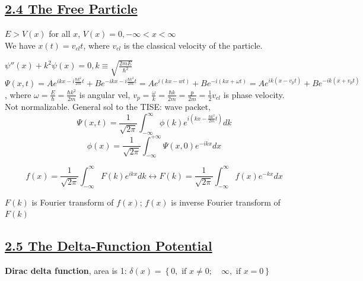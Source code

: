 
\subsection{\underline{2.4 The Free Particle}}
$E > V(x)$ for all $x$, $V(x) = 0, -\infty < x < \infty$ \\

We have $x(t) = v_{cl} t$, where $v_{cl}$ is the classical velocity of the particle.

$\psi''(x) + k^2 \psi(x) = 0, k \equiv \sqrt{\frac{2mE}{\hbar^2}}$ \\
$\Psi(x, t) = Ae^{ikx - i \frac{\hbar k^2}{2m} t} + Be^{-ikx - i \frac{\hbar k^2}{2m} t} = A e^{i(kx - wt)} + Be^{-i(kx + \omega t)} = A e^{ik(x - v_p t)} + Be^{-ik(x + v_{p} t)}$,
where $\omega = \frac{E}{\hbar} = \frac{\hbar k^2}{2m}$ is angular vel, $v_p = \frac{\omega}{k} = \frac{\hbar k }{2m} = \frac{p}{2m} = \frac{1}{2} v_{cl}$ is phase velocity. \\

Not normalizable. General sol to the TISE: wave packet, 
$$\Psi(x, t) = \frac{1}{\sqrt{2\pi}} \int_{-\infty}^{\infty} \phi(k) e^{i (kx - \frac{\hbar k^2}{2m} t)} dk$$
$$\phi(x) = \frac{1}{\sqrt{2 \pi}} \int_{-\infty}^{+\infty} \Psi(x, 0) e^{-ikx} dx$$

$$f(x) = \frac{1}{\sqrt{2 \pi}} \int_{-\infty}^{\infty} F(k) e^{ikx} dk \leftrightarrow F(k) = \frac{1}{\sqrt{2\pi}} \int_{-\infty}^{\infty} f(x) e^{-kx} dx$$

$F(k)$ is Fourier transform of $f(x)$; $f(x)$ is inverse Fourier transform of $F(k)$ \\



\subsection{\underline{2.5 The Delta-Function Potential}}

\textbf{Dirac delta function}, area is 1:
$\delta(x) = \left\{ 0, \textrm { if } x \neq 0; \quad \infty, \textrm{ if } x = 0 \right\}$

